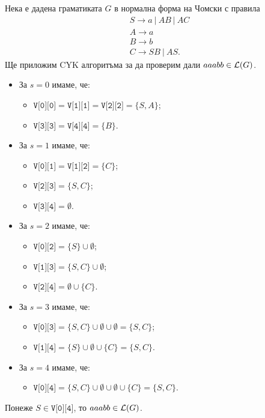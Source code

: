 {\scriptsize

\begin{multicols}{2}
  
\begin{example}
  Нека е дадена граматиката $G$ в нормална форма на Чомски с правила 
  \begin{align*}
    & S\rightarrow a\ |\ AB\ |\ AC\\
    & A\rightarrow a\\
    & B\rightarrow b\\
    & C\rightarrow SB\ |\ AS.
  \end{align*}
  Ще приложим CYK алгоритъма за да проверим дали $aaabb \in \mathcal{L}(G)$.
  
  \begin{itemize}
  \item 
    За $s = 0$ имаме, че:
    \begin{itemize}
    \item 
      $\texttt{V[0][0]} = \texttt{V[1][1]} = \texttt{V[2][2]} = \{S,A\}$;
    \item
      $\texttt{V[3][3]} = \texttt{V[4][4]} = \{B\}$.
    \end{itemize}
  \item
    За $s = 1$ имаме, че:
    \begin{itemize}
    \item
      $\texttt{V[0][1]} = \texttt{V[1][2]} = \{C\}$;
    \item
      $\texttt{V[2][3]} = \{S,C\}$;
    \item
      $\texttt{V[3][4]} = \emptyset$.
    \end{itemize}
  \item
    За $s = 2$ имаме, че:
    \begin{itemize}
    \item
      $\texttt{V[0][2]} = \{S\} \cup \emptyset$;
    \item
      $\texttt{V[1][3]} = \{S,C\} \cup \emptyset$;
    \item
      $\texttt{V[2][4]} = \emptyset \cup \{C\}$.
    \end{itemize}
  \item
    За $s = 3$ имаме, че:
    \begin{itemize}
    \item
      $\texttt{V[0][3]} = \{S,C\} \cup \emptyset \cup \emptyset = \{S,C\}$;
    \item
      $\texttt{V[1][4]} = \{S\} \cup \emptyset \cup \{C\} = \{S,C\}$.
    \end{itemize}
  \item
    За $s = 4$ имаме, че:
    \begin{itemize}
    \item 
      $\texttt{V[0][4]} = \{S,C\} \cup \emptyset \cup \emptyset \cup \{C\}= \{S,C\}$.
    \end{itemize}
  \end{itemize}
  Понеже $S \in \texttt{V[0][4]}$, то $aaabb \in \mathcal{L}(G)$.
\end{example}
\end{multicols}

}


